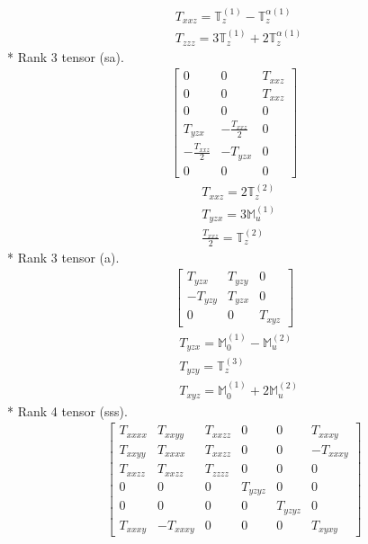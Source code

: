 \documentclass[fleqn,8pt,landscape]{jsarticle}
\begin{document}
\begin{align*}
& T_{xxz} = \mathbb{T}_{z}^{(1)} - \mathbb{T}_{z}^{\alpha(1)} \\
& T_{zzz} = 3 \mathbb{T}_{z}^{(1)} + 2 \mathbb{T}_{z}^{\alpha(1)}
\end{align*}
* Rank 3 tensor (sa).
\begin{align*}
\begin{bmatrix} 0 & 0 & T_{xxz} \\ 0 & 0 & T_{xxz} \\ 0 & 0 & 0 \\ T_{yzx} & - \frac{T_{xxz}}{2} & 0 \\ - \frac{T_{xxz}}{2} & - T_{yzx} & 0 \\ 0 & 0 & 0 \end{bmatrix}
\end{align*}
\begin{align*}
& T_{xxz} = 2 \mathbb{T}_{z}^{(2)} \\
& T_{yzx} = 3 \mathbb{M}_{u}^{(1)} \\
& \frac{T_{xxz}}{2} = \mathbb{T}_{z}^{(2)}
\end{align*}
* Rank 3 tensor (a).
\begin{align*}
\begin{bmatrix} T_{yzx} & T_{yzy} & 0 \\ - T_{yzy} & T_{yzx} & 0 \\ 0 & 0 & T_{xyz} \end{bmatrix}
\end{align*}
\begin{align*}
& T_{yzx} = \mathbb{M}_{0}^{(1)} - \mathbb{M}_{u}^{(2)} \\
& T_{yzy} = \mathbb{T}_{z}^{(3)} \\
& T_{xyz} = \mathbb{M}_{0}^{(1)} + 2 \mathbb{M}_{u}^{(2)}
\end{align*}
* Rank 4 tensor (sss).
\begin{align*}
\begin{bmatrix} T_{xxxx} & T_{xxyy} & T_{xxzz} & 0 & 0 & T_{xxxy} \\ T_{xxyy} & T_{xxxx} & T_{xxzz} & 0 & 0 & - T_{xxxy} \\ T_{xxzz} & T_{xxzz} & T_{zzzz} & 0 & 0 & 0 \\ 0 & 0 & 0 & T_{yzyz} & 0 & 0 \\ 0 & 0 & 0 & 0 & T_{yzyz} & 0 \\ T_{xxxy} & - T_{xxxy} & 0 & 0 & 0 & T_{xyxy} \end{bmatrix}
\end{align*}
\end{document}
